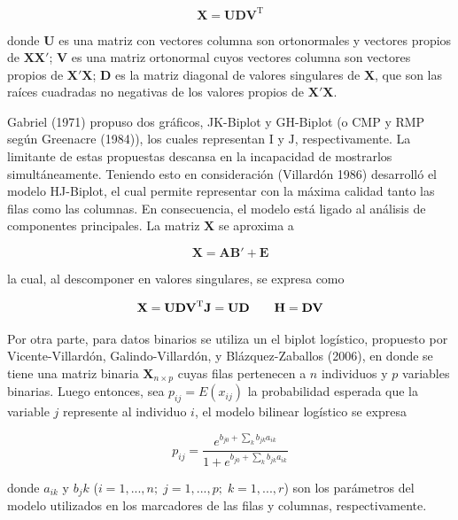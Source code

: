 \documentclass[
  10pt,
  spanish,
]{article}
\begin{document}
\begin{equation}
\mathbf{X} = \mathbf{UDV}^{\mathrm{T}}
\end{equation}

donde \(\mathbf{U}\) es una matriz con vectores columna son ortonormales
y vectores propios de \(\mathbf{XX'}\); \(\mathbf{V}\) es una matriz
ortonormal cuyos vectores columna son vectores propios de
\(\mathbf{X'X}\); \(\mathbf{D}\) es la matriz diagonal de valores
singulares de \(\mathbf{X}\), que son las raíces cuadradas no negativas
de los valores propios de \(\mathbf{X'X}\).

Gabriel (1971) propuso dos gráficos, JK-Biplot y GH-Biplot (o CMP y RMP
según Greenacre (1984)), los cuales representan \(\mathrm{I}\) y
\(\mathrm{J}\), respectivamente. La limitante de estas propuestas
descansa en la incapacidad de mostrarlos simultáneamente. Teniendo esto
en consideración (Villardón 1986) desarrolló el modelo HJ-Biplot, el
cual permite representar con la máxima calidad tanto las filas como las
columnas. En consecuencia, el modelo está ligado al análisis de
componentes principales. La matriz \(\mathbf{X}\) se aproxima a

\begin{equation}
\mathbf{X} = \mathbf{AB'} + \mathbf{E}
\end{equation}

la cual, al descomponer en valores singulares, se expresa como

\begin{equation}
\mathbf{X} = \mathbf{UDV}^{\mathrm{T}} \\
\mathbf{J} = \mathbf{UD} \qquad \mathbf{H} = \mathbf{DV}
\end{equation}

Por otra parte, para datos binarios se utiliza un el biplot logístico,
propuesto por Vicente-Villardón, Galindo-Villardón, y Blázquez-Zaballos
(2006), en donde se tiene una matriz binaria \(\mathbf{X}_{n \times p}\)
cuyas filas pertenecen a \(n\) individuos y \(p\) variables binarias.
Luego entonces, sea \(p_{ij} = E(x_{ij})\) la probabilidad esperada que
la variable \(j\) represente al individuo \(i\), el modelo bilinear
logístico se expresa

\begin{equation}
p_{ij} = \frac{e^{b_{j0} + \sum_k b_{jk}a_{ik}}}{1 + e^{b_{j0} + \sum_k b_{jk}a_{ik}}}
\end{equation}

donde \(a_{ik}\) y \(b_jk\)
(\(i = 1, ...,n; \; j=1, ..., p; \; k=1, ..., r\)) son los parámetros
del modelo utilizados en los marcadores de las filas y columnas,
respectivamente.
\end{document}
